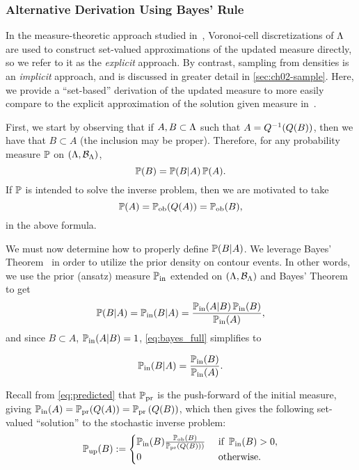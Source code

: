 \subsubsection{Alternative Derivation Using Bayes' Rule}\label{sec:set_bayes}
In the measure-theoretic approach studied in~\cite{BBE11, BET+14}, Voronoi-cell discretizations of ${\Lambda}$ are used to construct set-valued approximations of the updated measure directly, so we refer to it as the \emph{explicit} approach.
By contrast, sampling from densities is an \emph{implicit} approach, and is discussed in greater detail in \ref{sec:ch02-sample}.
Here, we provide a ``set-based'' derivation of the updated measure to more easily compare to the explicit approximation of the solution given measure in~\cite{BET+14}.

First, we start by observing that if $A, B \subset {\Lambda}$ such that $A = Q^{-1}(Q(B))$, then we have that $B\subset A$ (the inclusion may be proper).
Therefore, for any probability measure $\mathbb{P}$ on $({\Lambda}, \mathcal{B}_{{\Lambda}})$,
\[
\mathbb{P}(B) = \mathbb{P}(B|A) \, \mathbb{P}(A).
\]
If $\mathbb{P}$ is intended to solve the inverse problem, then we are motivated to take
\[
\mathbb{P}(A) = \operatorname*{\mathbb{P}_{ob}} (Q(A)) = \operatorname*{\mathbb{P}_{ob}} (B),
\]
in the above formula.

We must now determine how to properly define $\mathbb{P}(B|A)$.
We leverage Bayes' Theorem~\cite{Smith} in order to utilize the prior density on contour events.
In other words, we use the prior (ansatz) measure $\operatorname*{\mathbb{P}_{in}}$ extended on $({\Lambda}, \mathcal{B}_{{\Lambda}})$ and Bayes' Theorem to get
\begin{equation}\label{eq:bayes_full}
\mathbb{P}(B|A) = \operatorname*{\mathbb{P}_{in}}(B|A) = \frac{ \operatorname*{\mathbb{P}_{in}}(A|B) \operatorname*{\mathbb{P}_{in}}(B) }{ \operatorname*{\mathbb{P}_{in}}(A) },
\end{equation}
and since $B \subset A$, $\operatorname*{\mathbb{P}_{in}}(A|B) = 1$, \eqref{eq:bayes_full} simplifies to

\begin{equation}\label{eq:bayes}
\operatorname*{\mathbb{P}_{in}}(B|A) = \frac{ \operatorname*{\mathbb{P}_{in}}(B) }{ \operatorname*{\mathbb{P}_{in}}(A) }.
\end{equation}

Recall from \eqref{eq:predicted} that $\operatorname*{\mathbb{P}_{pr}}$ is the push-forward of the initial measure, giving $\operatorname*{\mathbb{P}_{in}}(A) = \operatorname*{\mathbb{P}_{pr}} (Q(A)) = \operatorname*{\mathbb{P}_{pr}} \left (Q(B)\right )$, which then gives the following set-valued ``solution'' to the stochastic inverse problem:
\begin{equation}\label{eq:sip_sol_cont}
\operatorname*{\mathbb{P}_{up}}(B) := \begin{cases}
\operatorname*{\mathbb{P}_{in}}(B) \frac{ \operatorname*{\mathbb{P}_{ob}}(B) }{ \operatorname*{\mathbb{P}_{pr}} \left (Q(B)\right ) ) } & \text{ if } \operatorname*{\mathbb{P}_{in}}(B) > 0,\\
0 & \text{ otherwise}.
\end{cases}
\end{equation}

